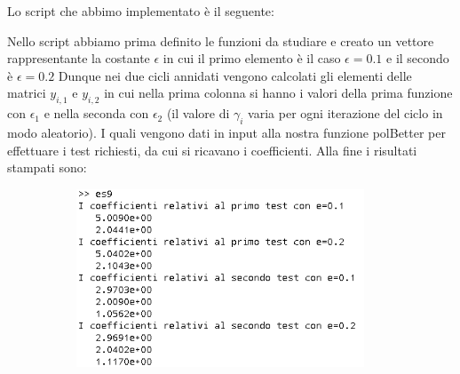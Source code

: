 \begin{flushleft}
Lo script che abbimo implementato è il seguente:

Nello script abbiamo prima definito le funzioni da studiare e creato un vettore rappresentante la costante $\epsilon$ in cui il primo elemento è il caso $\epsilon=0.1$ e il secondo è $\epsilon=0.2$ Dunque nei due cicli annidati vengono calcolati gli elementi delle matrici $y_{i,1}$ e $y_{i,2}$ in cui nella prima colonna si hanno i valori della prima funzione con $\epsilon_1$ e nella seconda con $\epsilon_2$ (il valore di $\gamma_i$ varia per ogni iterazione del ciclo in modo aleatorio). I quali vengono dati in input alla nostra funzione polBetter per effettuare i test richiesti, da cui si ricavano i coefficienti. Alla fine i risultati stampati sono:
\begin{figure}[H]
\includegraphics[left, width=400px, height=200px]{cap_4/es9/es49.png}
\end{figure}
\end{flushleft}